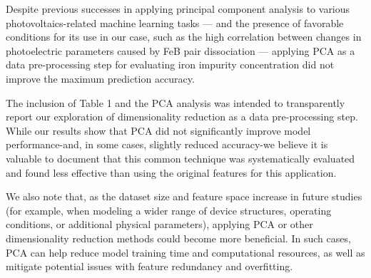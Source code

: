 \documentclass[a4paper,fleqn]{cas-sc}
\begin{document}
Despite previous successes in applying principal component analysis to various photovoltaics-related machine learning tasks ---
and the presence of favorable conditions for its use in our case,
such as the high correlation between changes in photoelectric parameters caused by FeB pair dissociation ---
applying PCA as a data pre-processing step for evaluating iron impurity concentration did not improve the maximum prediction accuracy.







The inclusion of Table 1 and the PCA analysis was intended to transparently report our exploration of dimensionality reduction as a data pre-processing step.
While our results show that PCA did not significantly improve model performance-and, in some cases, slightly reduced accuracy-we believe it is valuable to document that this common technique was systematically evaluated and found less effective than using the original features for this application.


We also note that, as the dataset size and feature space increase in future studies (for example, when modeling a wider range of device structures, operating conditions, or additional physical parameters), applying PCA or other dimensionality reduction methods could become more beneficial.
In such cases, PCA can help reduce model training time and computational resources, as well as mitigate potential issues with feature redundancy and overfitting.
\end{document}

